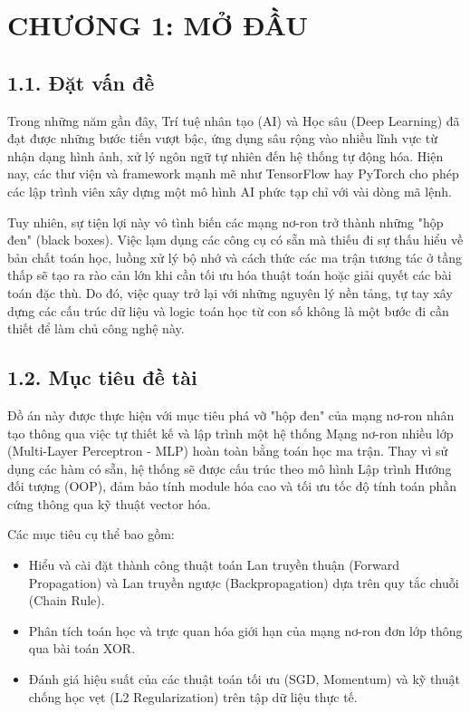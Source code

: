 \documentclass[13pt,a4paper]{article}
\begin{document}
\renewcommand{\listfigurename}{\begin{center} DANH MỤC HÌNH ẢNH \end{center}}
\listoffigures
\newpage
\section*{CHƯƠNG 1: MỞ ĐẦU}

\subsection*{1.1. Đặt vấn đề}
Trong những năm gần đây, Trí tuệ nhân tạo (AI) và Học sâu (Deep Learning) đã đạt được những bước tiến vượt bậc, ứng dụng sâu rộng vào nhiều lĩnh vực từ nhận dạng hình ảnh, xử lý ngôn ngữ tự nhiên đến hệ thống tự động hóa. Hiện nay, các thư viện và framework mạnh mẽ như TensorFlow hay PyTorch cho phép các lập trình viên xây dựng một mô hình AI phức tạp chỉ với vài dòng mã lệnh.

Tuy nhiên, sự tiện lợi này vô tình biến các mạng nơ-ron trở thành những "hộp đen" (black boxes). Việc lạm dụng các công cụ có sẵn mà thiếu đi sự thấu hiểu về bản chất toán học, luồng xử lý bộ nhớ và cách thức các ma trận tương tác ở tầng thấp sẽ tạo ra rào cản lớn khi cần tối ưu hóa thuật toán hoặc giải quyết các bài toán đặc thù. Do đó, việc quay trở lại với những nguyên lý nền tảng, tự tay xây dựng các cấu trúc dữ liệu và logic toán học từ con số không là một bước đi cần thiết để làm chủ công nghệ này.

\subsection*{1.2. Mục tiêu đề tài}
Đồ án này được thực hiện với mục tiêu phá vỡ "hộp đen" của mạng nơ-ron nhân tạo thông qua việc tự thiết kế và lập trình một hệ thống Mạng nơ-ron nhiều lớp (Multi-Layer Perceptron - MLP) hoàn toàn bằng toán học ma trận. Thay vì sử dụng các hàm có sẵn, hệ thống sẽ được cấu trúc theo mô hình Lập trình Hướng đối tượng (OOP), đảm bảo tính module hóa cao và tối ưu tốc độ tính toán phần cứng thông qua kỹ thuật vector hóa.

Các mục tiêu cụ thể bao gồm:
\begin{itemize}
    \item Hiểu và cài đặt thành công thuật toán Lan truyền thuận (Forward Propagation) và Lan truyền ngược (Backpropagation) dựa trên quy tắc chuỗi (Chain Rule).
    \item Phân tích toán học và trực quan hóa giới hạn của mạng nơ-ron đơn lớp thông qua bài toán XOR.
    \item Đánh giá hiệu suất của các thuật toán tối ưu (SGD, Momentum) và kỹ thuật chống học vẹt (L2 Regularization) trên tập dữ liệu thực tế.
\end{itemize}
\end{document}
